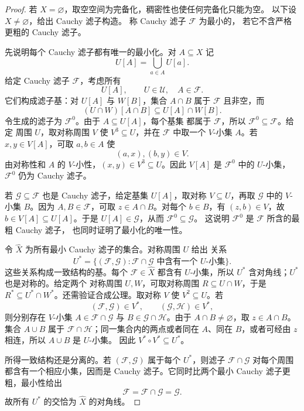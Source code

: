 \begin{proof}
若 \(X=\varnothing\)，取空空间为完备化，稠密性也使任何完备化只能为空。
以下设 \(X\ne\varnothing\)，给出 Cauchy 滤子构造。
称 Cauchy 滤子 \(\mathcal F\) 为最小的，
若它不含严格更粗的 Cauchy 滤子。

先说明每个 Cauchy 滤子都有唯一的最小化。对 \(A\subseteq X\) 记
\[
 U[A]=\bigcup_{a\in A}U[a].
\]
给定 Cauchy 滤子 \(\mathcal F\)，考虑所有
\[
 U[A],\qquad U\in\mathcal U,\quad A\in\mathcal F.
\]
它们构成滤子基：对 \(U[A]\) 与 \(W[B]\)，集合
\(A\cap B\) 属于 \(\mathcal F\) 且非空，而
\[
 (U\cap W)[A\cap B]\subseteq U[A]\cap W[B].
\]
令生成的滤子为 \(\mathcal F^0\)。由于 \(A\subseteq U[A]\)，每个基集
都属于 \(\mathcal F\)，所以 \(\mathcal F^0\subseteq\mathcal F\)。给定
周围 \(U\)，取对称周围 \(V\) 使 \(V^3\subseteq U\)，并在
\(\mathcal F\) 中取一个 \(V\)-小集 \(A\)。若 \(x,y\in V[A]\)，可取
\(a,b\in A\) 使
\[
 (a,x),(b,y)\in V.
\]
由对称性和 \(A\) 的 \(V\)-小性，\((x,y)\in V^3\subseteq U\)。因此
\(V[A]\) 是 \(\mathcal F^0\) 中的 \(U\)-小集，\(\mathcal F^0\) 仍为
Cauchy 滤子。

若 \(\mathcal G\subseteq\mathcal F\) 也是 Cauchy 滤子，给定基集
\(U[A]\)，取对称 \(V\subseteq U\)，再取 \(\mathcal G\) 中的
\(V\)-小集 \(B\)。因为 \(A,B\in\mathcal F\)，可取
\(z\in A\cap B\)。对每个 \(b\in B\)，有
\((z,b)\in V\)，故 \(b\in V[A]\subseteq U[A]\)。于是
\(U[A]\in\mathcal G\)，从而 \(\mathcal F^0\subseteq\mathcal G\)。
这说明 \(\mathcal F^0\) 是 \(\mathcal F\) 所含的最粗 Cauchy 滤子，
也同时证明了最小化的唯一性。

令 \(\widehat X\) 为所有最小 Cauchy 滤子的集合。对称周围 \(U\) 给出
关系
\[
 U^*=\{(\mathcal F,\mathcal G):
 \mathcal F\cap\mathcal G\text{ 中含有一个 }U\text{-小集}\}.
\]
这些关系构成一致结构的基。每个 \(\mathcal F\in\widehat X\) 都含有
\(U\)-小集，所以 \(U^*\) 含对角线；\(U^*\) 也是对称的。给定两个
对称周围 \(U,W\)，可取对称周围 \(R\subseteq U\cap W\)，于是
\(R^*\subseteq U^*\cap W^*\)。还需验证合成公理。取对称 \(V\) 使
\(V^2\subseteq U\)。若
\[
 (\mathcal F,\mathcal G)\in V^*,\qquad
 (\mathcal G,\mathcal H)\in V^*,
\]
则分别存在 \(V\)-小集
\(A\in\mathcal F\cap\mathcal G\) 与
\(B\in\mathcal G\cap\mathcal H\)。由于 \(A\cap B\ne\varnothing\)，取
\(z\in A\cap B\)。集合 \(A\cup B\) 属于
\(\mathcal F\cap\mathcal H\)；同一集合内的两点或者同在 \(A\)、同在
\(B\)，或者可经由 \(z\) 相连，所以 \(A\cup B\) 是 \(U\)-小集。
因此 \(V^*\circ V^*\subseteq U^*\)。

所得一致结构还是分离的。若
\((\mathcal F,\mathcal G)\) 属于每个 \(U^*\)，则滤子
\(\mathcal F\cap\mathcal G\) 对每个周围都含有一个相应小集，因而是
Cauchy 滤子。它同时比两个最小 Cauchy 滤子更粗，最小性给出
\[
 \mathcal F=\mathcal F\cap\mathcal G=\mathcal G.
\]
故所有 \(U^*\) 的交恰为 \(\widehat X\) 的对角线。


\end{proof}
